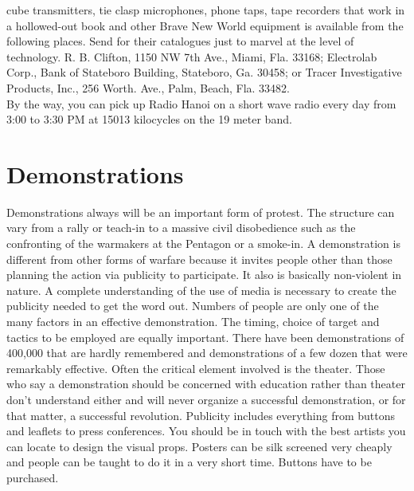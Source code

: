 \documentclass[11pt,twoside,a4paper]{book}
\begin{document}
cube transmitters, tie clasp microphones, phone taps, tape recorders that work in a hollowed-out book and other Brave New World equipment is available from the following places. Send for their catalogues just to marvel at the level of technology. R. B. Clifton, 1150 NW 7th Ave., Miami, Fla. 33168; Electrolab Corp., Bank of Stateboro Building, Stateboro, Ga. 30458; or Tracer Investigative Products, Inc., 256 Worth. Ave., Palm, Beach, Fla. 33482.~\\

By the way, you can pick up Radio Hanoi on a short wave radio every day from 3:00 to 3:30 PM at 15013 kilocycles on the 19 meter band. 

\section{Demonstrations}

Demonstrations always will be an important form of protest. The structure can vary from a rally or teach-in to a massive civil disobedience such as the confronting of the warmakers at the Pentagon or a smoke-in. A demonstration is different from other forms of warfare because it invites people other than those planning the action via publicity to participate. It also is basically non-violent in nature. A complete understanding of the use of media is necessary to create the publicity needed to get the word out. Numbers of people are only one of the many factors in an effective demonstration. The timing, choice of target and tactics to be employed are equally important. There have been demonstrations of 400,000 that are hardly remembered and demonstrations of a few dozen that were remarkably effective. Often the critical element involved is the theater. Those who say a demonstration should be concerned with education rather than theater don't understand either and will never organize a successful demonstration, or for that matter, a successful revolution. Publicity includes everything from buttons and leaflets to press conferences. You should be in touch with the best artists you can locate to design the visual props. Posters can be silk screened very cheaply and people can be taught to do it in a very short time. Buttons have to be purchased. ~\\
\end{document}
